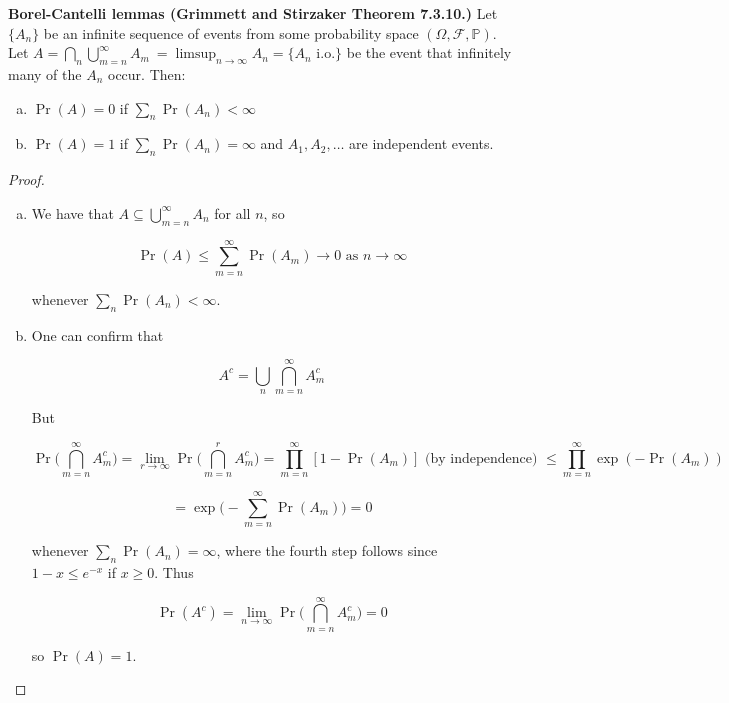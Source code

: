\begin{theorem}\textbf{Borel-Cantelli lemmas (Grimmett and Stirzaker Theorem 7.3.10.)} Let \(\{A_n\}\) be an infinite sequence of events from some probability space \((\Omega, \mathcal{F}, \mathbb{P})\). Let \(A = \bigcap_n \bigcup_{m=n}^\infty A_m\ = \limsup_{n \to \infty} A_n = \{A_n \text{ i.o.}\}\) be the event that infinitely many of the \(A_n\) occur. Then:

\begin{enumerate}[(a)]

\item \(\Pr(A) = 0 \) if \(\sum_n \Pr(A_n) < \infty\)

\item \(\Pr(A) = 1\) if \(\sum_n \Pr(A_n) = \infty\) and \(A_1, A_2, \ldots\) are independent events.

\end{enumerate}
\end{theorem}

\begin{proof}
\begin{enumerate}[(a)]

\item We have that \(A \subseteq \bigcup_{m=n}^\infty A_n\) for all \(n\), so

\[
\Pr(A) \leq \sum_{m=n}^\infty \Pr(A_m) \to 0 \text{ as } n \to \infty
\]

whenever \(\sum_n \Pr(A_n) < \infty\).

\item One can confirm that 

\[
A^c = \bigcup_n \bigcap_{m=n}^\infty A_m^c
\]

But 

\[
\Pr \bigg( \bigcap_{m=n}^\infty A_m^c \bigg) = \lim_{r \to \infty}\Pr \bigg( \bigcap_{m=n}^r A_m^c \bigg) = \prod_{m=n}^\infty[ 1 - \Pr(A_m)] \text{ (by independence) } \leq  \prod_{m=n}^\infty \exp(- \Pr(A_m)) 
\]

\[
= \exp \bigg(- \sum_{m=n}^\infty \Pr(A_m) \bigg) = 0
\]

whenever \(\sum_n \Pr(A_n) = \infty\), where the fourth step follows since \(1 - x \leq e^{-x}\) if \(x \geq 0\). Thus

\[
\Pr(A^c) = \lim_{n \to \infty} \Pr \bigg( \bigcap_{m=n}^\infty A_m^c \bigg) = 0
\]

so \(\Pr(A) = 1\).

\end{enumerate}
\end{proof}

